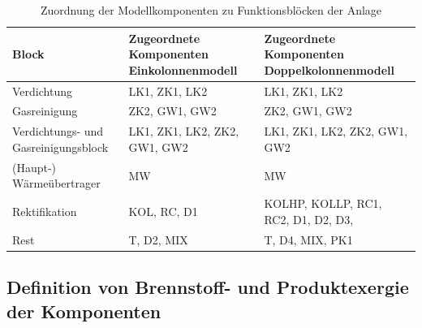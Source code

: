\begin{table}[h]
\centering
\small
\setlength{\tabcolsep}{4pt}
\caption{Zuordnung der Modellkomponenten zu Funktionsblöcken der Anlage}
\label{tab:block_definition}
\begin{tabular}{p{3.5cm} p{5.5cm} p{5.5cm}}
\toprule
Block &
Zugeordnete Komponenten Einkolonnenmodell &
Zugeordnete Komponenten Doppelkolonnenmodell\\
\midrule
Verdichtung & LK1, ZK1, LK2 & LK1, ZK1, LK2\\
Gasreinigung & ZK2, GW1, GW2 & ZK2, GW1, GW2\\
Verdichtungs- und Gasreinigungsblock & LK1, ZK1, LK2, ZK2, GW1, GW2 & LK1, ZK1, LK2, ZK2, GW1, GW2\\
(Haupt-) Wärmeübertrager & MW & MW\\
Rektifikation & KOL, RC, D1 & KOLHP, KOLLP, RC1, RC2, D1, D2, D3,\\
Rest & T, D2, MIX & T, D4, MIX, PK1 \\
\bottomrule
\end{tabular}
\end{table}

\subsection{Definition von Brennstoff- und Produktexergie der Komponenten}
\label{sec:modell_komponenten}

